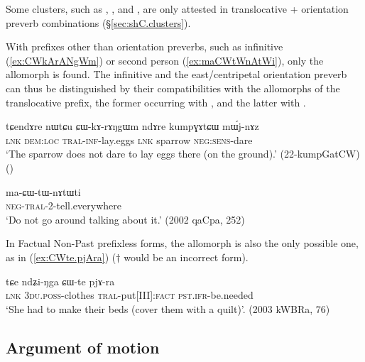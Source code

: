 Some clusters, such as , , and , are only attested in translocative + orientation preverb combinations (§\ref{sec:shC.clusters}).

With prefixes other than orientation preverbs, such as infinitive  (\ref{ex:CWkArANgWm}) or second person  (\ref{ex:maCWtWnAtWi}), only the allomorph  is found. The infinitive  and the east/centripetal orientation preverb  can thus be distinguished by their compatibilities with the allomorphs of the translocative prefix, the former occurring with , and the latter with .

\begin{exe}
\ex \label{ex:CWkArANgWm}
 \gll tɕendɤre nɯtɕu ɕɯ-kɤ-rɤŋgɯm ndɤre kumpɣɤtɕɯ mɯ́j-nɤz \\
 \textsc{lnk} \textsc{dem}:\textsc{loc} \textsc{tral}-\textsc{inf}-lay.eggs \textsc{lnk} sparrow \textsc{neg}:\textsc{sens}-dare \\
 \glt `The sparrow does not dare to lay eggs there (on the ground).' (22-kumpGatCW) ()
\end{exe}

\begin{exe}
\ex  \label{ex:maCWtWnAtWi}
 \gll ma-ɕɯ-tɯ-nɤtɯti \\
 \textsc{neg}-\textsc{tral}-2-tell.everywhere \\
 \glt `Do not go around talking about it.' (2002 qaCpa, 252)
\end{exe}

In Factual Non-Past prefixless forms, the allomorph  is also the only possible one, as in (\ref{ex:CWte.pjAra}) ($\dagger$ would be an incorrect form).

\begin{exe}
\ex  \label{ex:CWte.pjAra}
 \gll  tɕe ndʑi-ŋga ɕɯ-te pjɤ-ra \\
 \textsc{lnk} \textsc{3du}.\textsc{poss}-clothes \textsc{tral}-put[III]:\textsc{fact} \textsc{pst}.\textsc{ifr}-be.needed \\
 \glt `She had to make their beds (cover them with a quilt)'. (2003 kWBRa, 76)
\end{exe}

\subsection{Argument of motion} \label{sec:AM.argument.motion}

